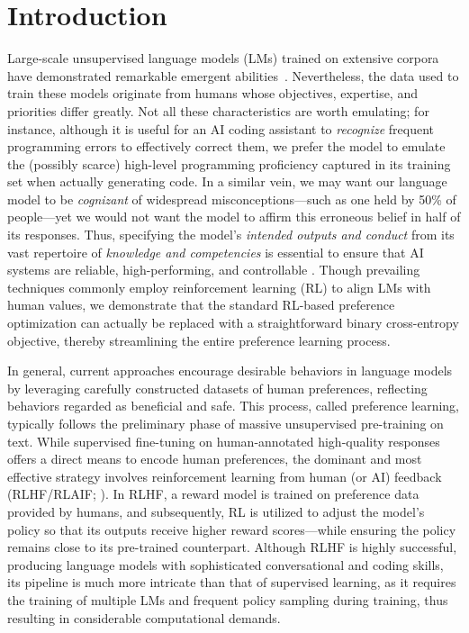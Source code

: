 \section{Introduction}
Large-scale unsupervised language models (LMs) trained on extensive corpora have demonstrated remarkable emergent abilities~\citep{chowdhery2022palm, brown2020language, touvron2023llama, bubeck2023sparks}. Nevertheless, the data used to train these models originate from humans whose objectives, expertise, and priorities differ greatly. Not all these characteristics are worth emulating; for instance, although it is useful for an AI coding assistant to \textit{recognize} frequent programming errors to effectively correct them, we prefer the model to emulate the (possibly scarce) high-level programming proficiency captured in its training set when actually generating code. In a similar vein, we may want our language model to be \textit{cognizant} of widespread misconceptions—such as one held by 50\% of people—yet we would not want the model to affirm this erroneous belief in half of its responses. Thus, specifying the model's \emph{intended outputs and conduct} from its vast repertoire of \textit{knowledge and competencies} is essential to ensure that AI systems are reliable, high-performing, and controllable \citep{ouyang2022training}. Though prevailing techniques commonly employ reinforcement learning (RL) to align LMs with human values, we demonstrate that the standard RL-based preference optimization can actually be replaced with a straightforward binary cross-entropy objective, thereby streamlining the entire preference learning process.

In general, current approaches encourage desirable behaviors in language models by leveraging carefully constructed datasets of human preferences, reflecting behaviors regarded as beneficial and safe. This process, called preference learning, typically follows the preliminary phase of massive unsupervised pre-training on text. While supervised fine-tuning on human-annotated high-quality responses offers a direct means to encode human preferences, the dominant and most effective strategy involves reinforcement learning from human (or AI) feedback (RLHF/RLAIF; \citep{christiano2017deep, bai2022constitutional}). In RLHF, a reward model is trained on preference data provided by humans, and subsequently, RL is utilized to adjust the model’s policy so that its outputs receive higher reward scores—while ensuring the policy remains close to its pre-trained counterpart. Although RLHF is highly successful, producing language models with sophisticated conversational and coding skills, its pipeline is much more intricate than that of supervised learning, as it requires the training of multiple LMs and frequent policy sampling during training, thus resulting in considerable computational demands.

